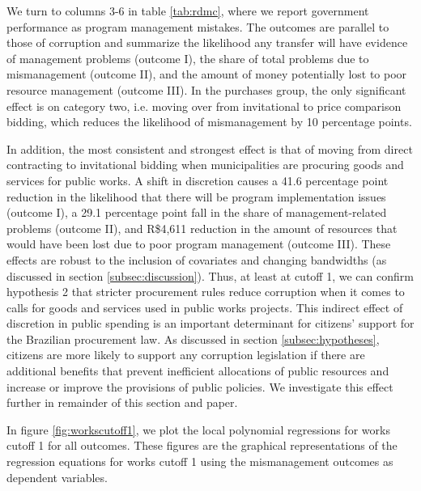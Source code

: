 \documentclass[11pt]{article}
\begin{document}
We turn to columns 3-6 in table \ref{tab:rdmc}, where we report government performance as program management mistakes. The outcomes are parallel to those of corruption and summarize the likelihood any transfer will have evidence of management problems (outcome I), the share of total problems due to mismanagement (outcome II), and the amount of money potentially lost to poor resource management (outcome III). In the purchases group, the only significant effect is on category two, i.e. moving over from invitational to price comparison bidding, which reduces the likelihood of mismanagement by 10 percentage points.

In addition, the most consistent and strongest effect is that of moving from direct contracting to invitational bidding when municipalities are procuring goods and services for public works. A shift in discretion causes a 41.6 percentage point reduction in the likelihood that there will be program implementation issues (outcome I), a 29.1 percentage point fall in the share of management-related problems (outcome II), and R\$4,611 reduction in the amount of resources that would have been lost due to poor program management (outcome III). These effects are robust to the inclusion of covariates and changing bandwidths (as discussed in section \ref{subsec:discussion}). Thus, at least at cutoff 1, we can confirm hypothesis 2 that stricter procurement rules reduce corruption when it comes to calls for goods and services used in public works projects. This indirect effect of discretion in public spending is an important determinant for citizens' support for the Brazilian procurement law. As discussed in section \ref{subsec:hypotheses}, citizens are more likely to support any corruption legislation if there are additional benefits that prevent inefficient allocations of public resources and increase or improve the provisions of public policies. We investigate this effect further in remainder of this section and paper.

 In figure \ref{fig:workscutoff1}, we plot the local polynomial regressions for works cutoff 1 for all outcomes. These figures are the graphical representations of the regression equations for works cutoff 1 using the mismanagement outcomes as dependent variables.
\end{document}
